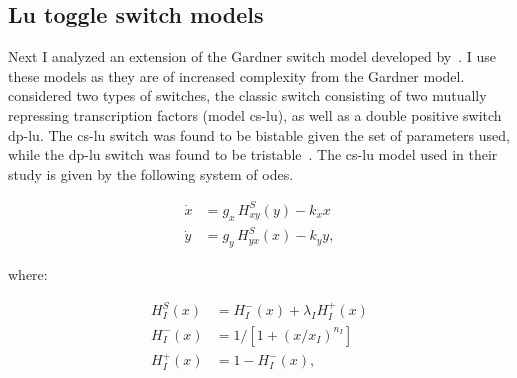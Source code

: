 \clearpage


\subsection{Lu toggle switch models}
\label{sec:lu}
Next I analyzed an extension of the Gardner switch model developed by~\textcite{Lu:2014kc}. I use these models as they are of increased complexity from the Gardner model. \textcite{Lu:2014kc} considered two types of switches, the classic switch consisting of two mutually repressing transcription factors (model \acrshort{cs-lu}), as well as a double positive switch \acrshort{dp-lu}.  The \acrshort{cs-lu} switch was found to be bistable given the set of parameters used, while the \acrshort{dp-lu} switch was found to be tristable~\autocite{Lu:2014kc}. The \acrshort{cs-lu} model used in their study is given by the following system of \acrshort{ode}s.

\begin{align}
\dot{x} & = g_{x}\, H^{S}_{xy}(y) -k_{x}x \\
\dot{y} & = g_{y}\,H^{S}_{yx}(x) -k_{y}y,
\end{align}

where:

\begin{align}
H^{S}_{I}(x) &= H^{-}_{I}(x)+\lambda_{I}H^{+}_{I}(x) \\
H^{-}_{I}(x) &= 1 \big/\left[1+(x/x_{I})^{n_{I}}\right] \\
H^{+}_{I}(x) &= 1-H^{-}_{I}(x),
\end{align}

